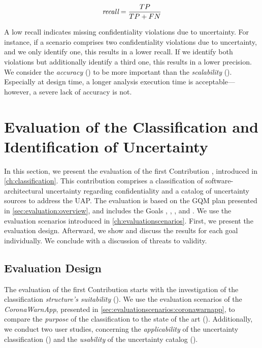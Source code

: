 \begin{equation*}
  \emph{recall} = \frac{TP}{TP + FN}
\end{equation*}

A low recall indicates missing confidentiality violations due to uncertainty.
For instance, if a scenario comprises two confidentiality violations due to uncertainty, and we only identify one, this results in a lower recall.
If we identify both violations but additionally identify a third one, this results in a lower precision.
We consider the \emph{accuracy} () to be more important than the \emph{scalability} ().
Especially at design time, a longer analysis execution time is acceptable---however, a severe lack of accuracy is not.





\section{Evaluation of the Classification and Identification of Uncertainty}%
\label{sec:evaluation:first}

In this section, we present the evaluation of the first Contribution , introduced in \autoref{ch:classification}.
This contribution comprises a classification of software-architectural uncertainty regarding confidentiality and a catalog of uncertainty sources to address the \ac{UAP}.
The evaluation is based on the \ac{GQM} plan presented in \autoref{sec:evaluation:overview}, and includes the Goals , , , and .
We use the evaluation scenarios introduced in \autoref{ch:evaluationscenarios}.
First, we present the evaluation design.
Afterward, we show and discuss the results for each goal individually.
We conclude with a discussion of threats to validity.


\subsection{Evaluation Design}

The evaluation of the first Contribution  starts with the investigation of the classification \emph{structure's suitability} ().
We use the evaluation scenarios of the \emph{CoronaWarnApp}, presented in \autoref{sec:evaluationscenarios:coronawarnapp}, to compare the \emph{purpose} of the classification to the state of the art ().
Additionally, we conduct two user studies, concerning the \emph{applicability} of the uncertainty classification () and the \emph{usability} of the uncertainty catalog ().

